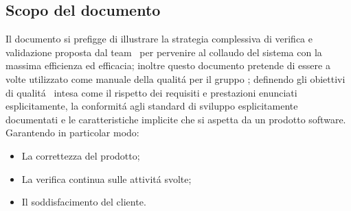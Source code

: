 \subsection{Scopo del documento}
Il documento si prefigge di illustrare la strategia complessiva di verifica e validazione proposta dal team \gruppo ~per pervenire al collaudo del sistema con la massima efficienza ed efficacia; inoltre questo documento pretende di essere a volte utilizzato come manuale della qualit\'a per il gruppo \gruppo; definendo gli obiettivi di qualit\'a ~intesa come il rispetto dei requisiti e prestazioni enunciati esplicitamente, la conformit\'a agli standard di sviluppo esplicitamente documentati e le caratteristiche implicite che si aspetta da un prodotto software. Garantendo in particolar modo:
\begin{itemize}
\item La correttezza del prodotto;
\item La verifica continua sulle attivit\'a svolte;
\item Il soddisfacimento del cliente.
\end{itemize}

